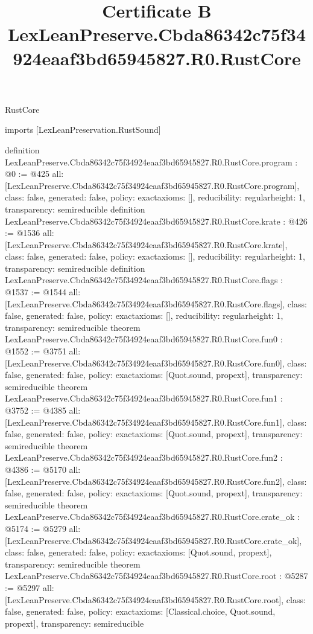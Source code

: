 \begin{lexlean}{RustCore}
\title{Certificate B LexLeanPreserve.Cbda86342c75f34924eaaf3bd65945827.R0.RustCore}
\begin{coremodule}
imports [LexLeanPreservation.RustSound]

definition LexLeanPreserve.Cbda86342c75f34924eaaf3bd65945827.R0.RustCore.program : @0 := @425 {
  all: [LexLeanPreserve.Cbda86342c75f34924eaaf3bd65945827.R0.RustCore.program],
  class: false,
  generated: false,
  policy: exact{axioms: []},
  reducibility: regular{height: 1},
  transparency: semireducible
}
definition LexLeanPreserve.Cbda86342c75f34924eaaf3bd65945827.R0.RustCore.krate : @426 := @1536 {
  all: [LexLeanPreserve.Cbda86342c75f34924eaaf3bd65945827.R0.RustCore.krate],
  class: false,
  generated: false,
  policy: exact{axioms: []},
  reducibility: regular{height: 1},
  transparency: semireducible
}
definition LexLeanPreserve.Cbda86342c75f34924eaaf3bd65945827.R0.RustCore.flags : @1537 := @1544 {
  all: [LexLeanPreserve.Cbda86342c75f34924eaaf3bd65945827.R0.RustCore.flags],
  class: false,
  generated: false,
  policy: exact{axioms: []},
  reducibility: regular{height: 1},
  transparency: semireducible
}
theorem LexLeanPreserve.Cbda86342c75f34924eaaf3bd65945827.R0.RustCore.fun0 : @1552 := @3751 {
  all: [LexLeanPreserve.Cbda86342c75f34924eaaf3bd65945827.R0.RustCore.fun0],
  class: false,
  generated: false,
  policy: exact{axioms: [Quot.sound, propext]},
  transparency: semireducible
}
theorem LexLeanPreserve.Cbda86342c75f34924eaaf3bd65945827.R0.RustCore.fun1 : @3752 := @4385 {
  all: [LexLeanPreserve.Cbda86342c75f34924eaaf3bd65945827.R0.RustCore.fun1],
  class: false,
  generated: false,
  policy: exact{axioms: [Quot.sound, propext]},
  transparency: semireducible
}
theorem LexLeanPreserve.Cbda86342c75f34924eaaf3bd65945827.R0.RustCore.fun2 : @4386 := @5170 {
  all: [LexLeanPreserve.Cbda86342c75f34924eaaf3bd65945827.R0.RustCore.fun2],
  class: false,
  generated: false,
  policy: exact{axioms: [Quot.sound, propext]},
  transparency: semireducible
}
theorem LexLeanPreserve.Cbda86342c75f34924eaaf3bd65945827.R0.RustCore.crate_ok : @5174 := @5279 {
  all: [LexLeanPreserve.Cbda86342c75f34924eaaf3bd65945827.R0.RustCore.crate_ok],
  class: false,
  generated: false,
  policy: exact{axioms: [Quot.sound, propext]},
  transparency: semireducible
}
theorem LexLeanPreserve.Cbda86342c75f34924eaaf3bd65945827.R0.RustCore.root : @5287 := @5297 {
  all: [LexLeanPreserve.Cbda86342c75f34924eaaf3bd65945827.R0.RustCore.root],
  class: false,
  generated: false,
  policy: exact{axioms: [Classical.choice, Quot.sound, propext]},
  transparency: semireducible
}


\end{coremodule}
\end{lexlean}
